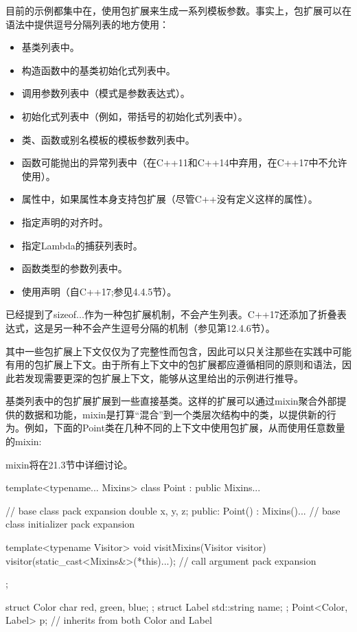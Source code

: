 目前的示例都集中在，使用包扩展来生成一系列模板参数。事实上，包扩展可以在语法中提供逗号分隔列表的地方使用：

\begin{itemize}
\item 
基类列表中。

\item 
构造函数中的基类初始化式列表中。

\item 
调用参数列表中（模式是参数表达式）。

\item 
初始化式列表中（例如，带括号的初始化式列表中）。

\item 
类、函数或别名模板的模板参数列表中。

\item 
函数可能抛出的异常列表中（在C++11和C++14中弃用，在C++17中不允许使用）。

\item 
属性中，如果属性本身支持包扩展（尽管C++没有定义这样的属性）。

\item 
指定声明的对齐时。

\item 
指定Lambda的捕获列表时。

\item 
函数类型的参数列表中。

\item 
使用声明（自C++17;参见4.4.5节）。
\end{itemize}

已经提到了sizeof...作为一种包扩展机制，不会产生列表。C++17还添加了折叠表达式，这是另一种不会产生逗号分隔的机制（参见第12.4.6节）。

其中一些包扩展上下文仅仅为了完整性而包含，因此可以只关注那些在实践中可能有用的包扩展上下文。由于所有上下文中的包扩展都应遵循相同的原则和语法，因此若发现需要更深的包扩展上下文，能够从这里给出的示例进行推导。

基类列表中的包扩展扩展到一些直接基类。这样的扩展可以通过mixin聚合外部提供的数据和功能，mixin是打算“混合”到一个类层次结构中的类，以提供新的行为。例如，下面的Point类在几种不同的上下文中使用包扩展，从而使用任意数量的mixin:

\begin{notice}
mixin将在21.3节中详细讨论。
\end{notice}

\begin{cpp}
template<typename... Mixins>
class Point : public Mixins... { // base class pack expansion
	double x, y, z;
public:
	Point() : Mixins()... { } // base class initializer pack expansion
	
	template<typename Visitor>
	void visitMixins(Visitor visitor) {
		visitor(static_cast<Mixins&>(*this)...); // call argument pack expansion
	}
};

struct Color { char red, green, blue; };
struct Label { std::string name; };
Point<Color, Label> p; // inherits from both Color and Label
\end{cpp}

